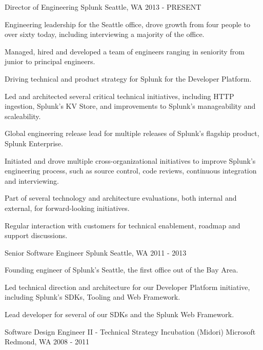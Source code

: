 \begin{cventries}
  \cventry
    {Director of Engineering}
    {Splunk}
    {Seattle, WA}
    {2013 - PRESENT}
    {
      \begin{cvitems}
        \item {Engineering leadership for the Seattle office, drove growth from four people to over sixty today, including interviewing a majority of the office.}
        \item {Managed, hired and developed a team of engineers ranging in seniority from junior to principal engineers.}
        \item {Driving technical and product strategy for Splunk for the Developer Platform.}
        \item {Led and architected several critical technical initiatives, including HTTP ingestion, Splunk's KV Store, and improvements to Splunk's manageability and scaleability.}
        \item {Global engineering release lead for multiple releases of Splunk's flagship product, Splunk Enterprise.}
        \item {Initiated and drove multiple cross-organizational initiatives to improve Splunk's engineering process, such as source control, code reviews, continuous integration and interviewing.}
        \item {Part of several technology and architecture evaluations, both internal and external, for forward-looking initiatives.}
        \item {Regular interaction with customers for technical enablement, roadmap and support discussions.}
      \end{cvitems}
    }
  \cventry
    {Senior Software Engineer}
    {Splunk}
    {Seattle, WA}
    {2011 - 2013}
    {
      \begin{cvitems}
    		\item {Founding engineer of Splunk's Seattle, the first office out of the Bay Area.}
    		\item {Led technical direction and architecture for our Developer Platform initiative, including Splunk's SDKs, Tooling and Web Framework.}
    		\item {Lead developer for several of our SDKs and the Splunk Web Framework.}
      \end{cvitems}
    }
  \cventry
    {Software Design Engineer II - Technical Strategy Incubation (Midori)}
    {Microsoft}
    {Redmond, WA}
    {2008 - 2011}
    {
      \begin{cvitems}

\end{cvitems}}
\end{cventries}
